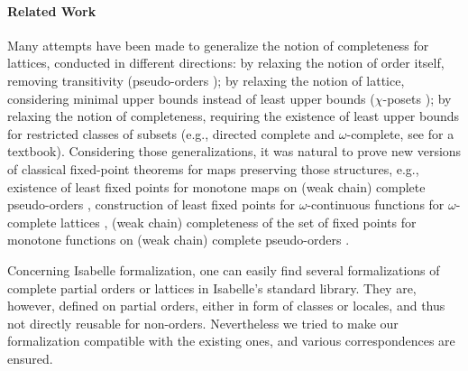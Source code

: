 \documentclass[11pt,a4paper]{article}
\begin{document}
\paragraph*{Related Work}
Many attempts have been made to generalize the notion of completeness for lattices, conducted in different directions: by relaxing the notion of order itself, removing transitivity (pseudo-orders \cite{trellis}); by relaxing the notion of lattice, considering minimal upper bounds instead of least upper bounds ($\chi$-posets \cite{LN83}); by relaxing the notion of completeness, requiring the existence of least upper bounds for restricted classes of subsets (e.g., directed complete and $\omega$-complete, see \cite{davey02} for a textbook). Considering those generalizations, it was natural to prove new versions of classical fixed-point theorems for maps preserving those structures, e.g., existence of least fixed points for monotone maps on (weak chain) complete pseudo-orders \cite{Bhatta05, SM13}, construction of least fixed points for $\omega$-continuous functions for $\omega$-complete lattices \cite{mashburn83}, (weak chain) completeness of the set of fixed points for monotone functions on (weak chain) complete pseudo-orders \cite{PG11}.

Concerning Isabelle formalization,
one can easily find several formalizations of complete partial orders or lattices in Isabelle's standard library.
They are, however, defined on partial orders, either in form of classes or locales,
and thus not directly reusable for non-orders.
Nevertheless we tried to make our formalization compatible with the existing ones,
and various correspondences are ensured.





\end{document}
